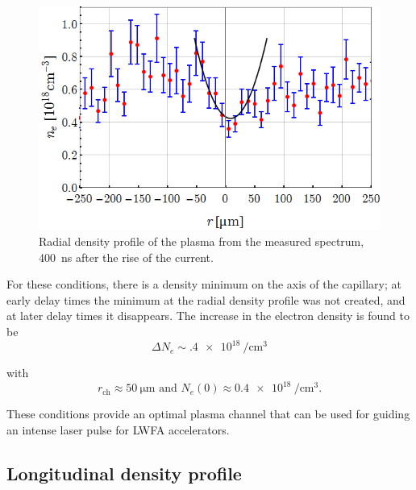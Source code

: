 \documentclass[../main.tex]{subfiles}
\begin{document}
\begin{figure}
\centering
\includegraphics[width=\textwidth]{figures/spectro/parabolic.png}
\caption{Radial density profile of the plasma from the measured spectrum, \SI{400}{\ns} after the rise of the current.}
\label{fig:plasma_channel_spectro}
\end{figure}

For these conditions, there is a density minimum on the axis of the capillary; at early delay times the minimum at the radial density profile was not created, and at later delay times it disappears. The increase in the electron density is found to be 
\begin{equation}
    \Delta N_e \sim \SI{.4e18}{\per\cubic\cm}
\end{equation}

with
\begin{equation}
r_\text{ch}\approx \SI{50}{\um} \text{ and } N_e\left(0\right)\approx \SI{0.4e18}{\per\cubic\cm}.
\end{equation}

These conditions provide an optimal plasma channel that can be used for guiding an intense laser pulse for LWFA accelerators.

\subsection{Longitudinal density profile}\label{ssec:longi}
\end{document}
